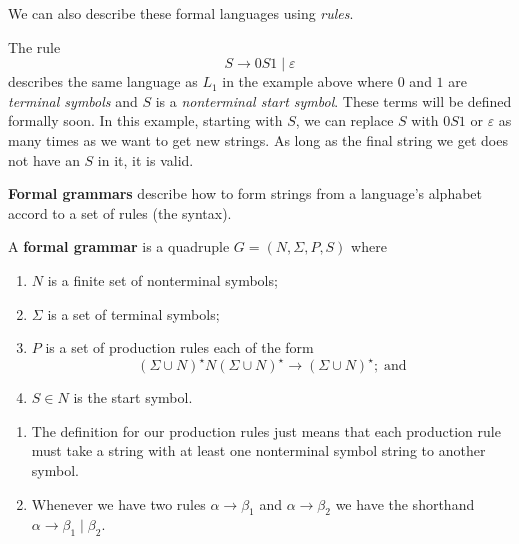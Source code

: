 We can also describe these formal languages using \emph{rules}.

\begin{example}
    The rule
    \[ S \to 0S1 \mid \varepsilon \]
    describes the same language as $L_1$ in the example above
    where $0$ and $1$ are \emph{terminal symbols} and $S$ is
    a \emph{nonterminal start symbol}. 
    These terms will be defined formally soon. In this example,
    starting with $S$, 
    we can replace $S$ with $0S1$ or $\varepsilon$ as many
    times as we want to get new strings. 
    As long as the final string we get does not have an $S$ in it,
    it is valid.
\end{example}

\textbf{Formal grammars} describe how to form strings from a language's
alphabet accord to a set of rules (the syntax).

\begin{definition}
    A \textbf{formal grammar} is a quadruple $G = (N, \Sigma, P, S)$ where
    \begin{enumerate}
        \item $N$ is a finite set of nonterminal symbols;
        \item $\Sigma$ is a set of terminal symbols;
        \item $P$ is a set of production rules each of the form
            \[ (\Sigma \cup N)^\star N (\Sigma \cup N)^\star \to
            (\Sigma \cup N)^\star;\;\text{and} \]
        \item $S \in N$ is the start symbol.
    \end{enumerate}
\end{definition}

\begin{remark}
    \hfill
    \begin{enumerate}
        \item 
            The definition for our production rules 
            just means that each production rule must take a string
            with at least one nonterminal symbol string to another symbol.

        \item
            Whenever we have two rules $\alpha \to \beta_1$ and $\alpha \to \beta_2$
            we have the shorthand $\alpha \to \beta_1 \mid \beta_2$.
    \end{enumerate}
\end{remark}


